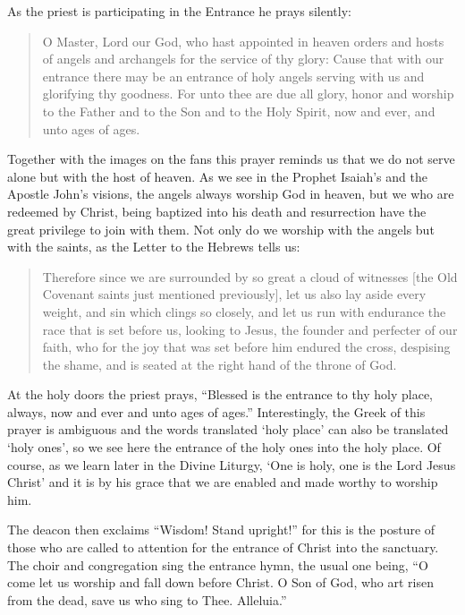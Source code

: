 \documentclass[
]{article}
\begin{document}
As the priest is participating in the Entrance he prays silently:

\begin{quote}
O Master, Lord our God, who hast appointed in heaven orders and hosts of
angels and archangels for the service of thy glory: Cause that with our
entrance there may be an entrance of holy angels serving with us and
glorifying thy goodness. For unto thee are due all glory, honor and
worship to the Father and to the Son and to the Holy Spirit, now and
ever, and unto ages of ages.
\end{quote}

Together with the images on the fans this prayer reminds us that we do
not serve alone but with the host of heaven. As we see in the Prophet
Isaiah's and the Apostle John's visions, the angels always worship God
in heaven, but we who are redeemed by Christ, being baptized into his
death and resurrection have the great privilege to join with them. Not
only do we worship with the angels but with the saints, as the Letter to
the Hebrews tells us:

\begin{quote}
Therefore since we are surrounded by so great a cloud of witnesses
{[}the Old Covenant saints just mentioned previously{]}, let us also lay
aside every weight, and sin which clings so closely, and let us run with
endurance the race that is set before us, looking to Jesus, the founder
and perfecter of our faith, who for the joy that was set before him
endured the cross, despising the shame, and is seated at the right hand
of the throne of God.
\end{quote}

At the holy doors the priest prays, ``Blessed is the entrance to thy
holy place, always, now and ever and unto ages of ages.'' Interestingly,
the Greek of this prayer is ambiguous and the words translated `holy
place' can also be translated `holy ones', so we see here the entrance
of the holy ones into the holy place. Of course, as we learn later in
the Divine Liturgy, `One is holy, one is the Lord Jesus Christ' and it
is by his grace that we are enabled and made worthy to worship him.

The deacon then exclaims ``Wisdom! Stand upright!'' for this is the
posture of those who are called to attention for the entrance of Christ
into the sanctuary. The choir and congregation sing the entrance hymn,
the usual one being, ``O come let us worship and fall down before
Christ. O Son of God, who art risen from the dead, save us who sing to
Thee. Alleluia.''
\end{document}
